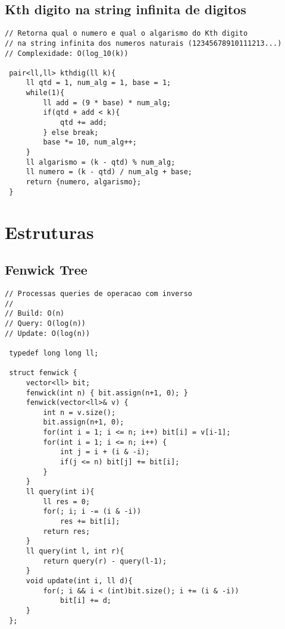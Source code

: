 \documentclass[11pt, a4paper, twoside]{article}
\begin{document}
\subsection{Kth digito na string infinita de digitos}
\begin{lstlisting}
// Retorna qual o numero e qual o algarismo do Kth digito 
// na string infinita dos numeros naturais (12345678910111213...)
// Complexidade: O(log_10(k))

 pair<ll,ll> kthdig(ll k){
     ll qtd = 1, num_alg = 1, base = 1;
     while(1){
         ll add = (9 * base) * num_alg;
         if(qtd + add < k){
             qtd += add;
         } else break;
         base *= 10, num_alg++;
     }
     ll algarismo = (k - qtd) % num_alg;
     ll numero = (k - qtd) / num_alg + base;
     return {numero, algarismo};
 }
\end{lstlisting}

\clearpage


%
%

\section{Estruturas}

\subsection{Fenwick Tree}
\begin{lstlisting}
// Processas queries de operacao com inverso
//
// Build: O(n)
// Query: O(log(n))
// Update: O(log(n))

 typedef long long ll;
 
 struct fenwick {
     vector<ll> bit;
     fenwick(int n) { bit.assign(n+1, 0); }
     fenwick(vector<ll>& v) {
         int n = v.size();
         bit.assign(n+1, 0);
         for(int i = 1; i <= n; i++) bit[i] = v[i-1];
         for(int i = 1; i <= n; i++) {
             int j = i + (i & -i);
             if(j <= n) bit[j] += bit[i];
         }
     }
     ll query(int i){
         ll res = 0;
         for(; i; i -= (i & -i))
             res += bit[i];
         return res;
     }
     ll query(int l, int r){
         return query(r) - query(l-1);
     }
     void update(int i, ll d){
         for(; i && i < (int)bit.size(); i += (i & -i))
             bit[i] += d;
     }
 };
\end{lstlisting}
\end{document}
